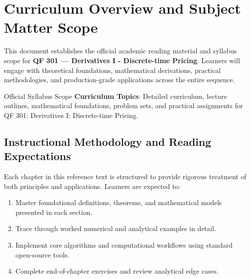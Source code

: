 \section{Curriculum Overview and Subject Matter Scope}

This document establishes the official academic reading material and syllabus scope for \textbf{QF 301 --- Derivatives I - Discrete-time Pricing}. Learners will engage with theoretical foundations, mathematical derivations, practical methodologies, and production-grade applications across the entire sequence.

\begin{InsightBox}{Official Syllabus Scope}
  \textbf{Curriculum Topics}: Detailed curriculum, lecture outlines, mathematical foundations, problem sets, and practical assignments for QF 301: Derivatives I: Discrete-time Pricing.
\end{InsightBox}

\subsection{Instructional Methodology and Reading Expectations}

Each chapter in this reference text is structured to provide rigorous treatment of both principles and applications. Learners are expected to:
\begin{enumerate}
  \item Master foundational definitions, theorems, and mathematical models presented in each section.
  \item Trace through worked numerical and analytical examples in detail.
  \item Implement core algorithms and computational workflows using standard open-source tools.
  \item Complete end-of-chapter exercises and review analytical edge cases.
\end{enumerate}

